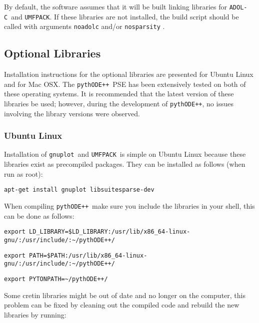 \documentclass[11pt]{article}
\newcommand{\pypp}{\texttt{pythODE++}}
\newcommand{\adolc}{\texttt{ADOL-C}}
\newcommand{\umfpack}{\texttt{UMFPACK}}
\newcommand{\gnuplot}{\texttt{gnuplot}}
\begin{document}
By default, the software assumes that it will be built linking
libraries for \adolc\ and \umfpack. If these libraries are not
installed, the build script should be called with arguments
\verb=noadolc= and/or \verb=nosparsity= .

\subsection{Optional Libraries}

Installation instructions for the optional libraries are presented for Ubuntu Linux and for Mac OSX. The \pypp\ PSE has been extensively tested on both of these operating systems. It is recommended that the latest version of these libraries be used; however, during the development of \pypp, no issues involving the library versions were observed.

\subsubsection{Ubuntu Linux}

Installation of \gnuplot\ and \umfpack\ is simple on Ubuntu Linux because these libraries exist as precompiled packages. They can be installed as follows (when run as root):
\begin{verbatim}
apt-get install gnuplot libsuitesparse-dev
\end{verbatim}
When compiling \pypp\, make sure you include the libraries in your shell, this can be done as follows:
\begin{verbatim}
export LD_LIBRARY=$LD_LIBRARY:/usr/lib/x86_64-linux-gnu/:/usr/include/:~/pythODE++/ 
\end{verbatim}

\begin{verbatim}
export PATH=$PATH:/usr/lib/x86_64-linux-gnu/:/usr/include/:~/pythODE++/ 
\end{verbatim}

\begin{verbatim}
export PYTONPATH=~/pythODE++/ 
\end{verbatim}
Some cretin libraries might be out of date and no longer on the computer, this problem can be fixed by cleaning out the compiled code and rebuild the new libraries by running:
\end{document}
